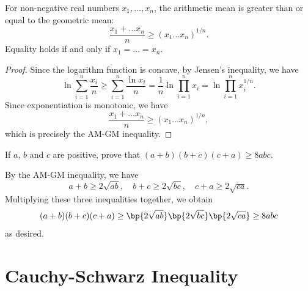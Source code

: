 \begin{theorem}[AM-GM Inequality]
    For non-negative real numbers $x_1, \dots, x_n$, the arithmetic mean is greater than or equal to the geometric mean: \[\frac{x_1 + \dots x_n}{n} \geq (x_1 \dots x_n)^{1/n}.\] Equality holds if and only if $x_1 = \dots = x_n$.
\end{theorem}
\begin{proof}
    Since the logarithm function is concave, by Jensen's inequality, we have \[\ln{\sum_{i = 1}^n \frac{x_i}n} \geq \sum_{i = 1}^n \frac{\ln{x_i}}n = \frac1n \ln{\prod_{i = 1}^n x_i} = \ln{\prod_{i = 1}^n x_i^{1/n}}.\] Since exponentiation is monotonic, we have \[\frac{x_1 + \dots x_n}{n} \geq (x_1 \dots x_n)^{1/n},\] which is precisely the AM-GM inequality.
\end{proof}

\begin{sample}
    If $a$, $b$ and $c$ are positive, prove that $(a+b)(b+c)(c+a) \geq 8abc$.
\end{sample}
\begin{sampans}
    By the AM-GM inequality, we have \[a + b \geq 2\sqrt{ab}, \quad b + c \geq 2\sqrt{bc}, \quad c + a \geq 2\sqrt{ca}.\] Multiplying these three inequalities together, we obtain \[(a+b)(b+c)(c+a) \geq \bp{2\sqrt{ab}}\bp{2\sqrt{bc}}\bp{2\sqrt{ca}} \geq 8abc\] as desired.
\end{sampans}

\section{Cauchy-Schwarz Inequality}

